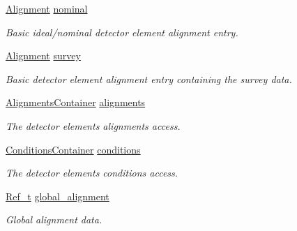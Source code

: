  \begin{DoxyCompactItemize}
\item 
\hyperlink{class_d_d4hep_1_1_alignments_1_1_alignment}{Alignment} \hyperlink{class_d_d4hep_1_1_geometry_1_1_det_element_object_a3020acb0795114c57c8d5bb536f310f4}{nominal}
\begin{DoxyCompactList}\small\item\em Basic ideal/nominal detector element alignment entry. \item\end{DoxyCompactList}\item 
\hyperlink{class_d_d4hep_1_1_alignments_1_1_alignment}{Alignment} \hyperlink{class_d_d4hep_1_1_geometry_1_1_det_element_object_ae01bd959a10eeb236ab0f21d7241a3a1}{survey}
\begin{DoxyCompactList}\small\item\em Basic detector element alignment entry containing the survey data. \item\end{DoxyCompactList}\item 
\hyperlink{class_d_d4hep_1_1_alignments_1_1_container}{AlignmentsContainer} \hyperlink{class_d_d4hep_1_1_geometry_1_1_det_element_object_a400be16718ec486e44ad340f86946fcd}{alignments}
\begin{DoxyCompactList}\small\item\em The detector elements alignments access. \item\end{DoxyCompactList}\item 
\hyperlink{class_d_d4hep_1_1_conditions_1_1_container}{ConditionsContainer} \hyperlink{class_d_d4hep_1_1_geometry_1_1_det_element_object_a80cf81ef1cd6f9f3d29865dee64ceaca}{conditions}
\begin{DoxyCompactList}\small\item\em The detector elements conditions access. \item\end{DoxyCompactList}\item 
\hyperlink{group___d_d4_h_e_p___g_e_o_m_e_t_r_y_ga40af83be6718bb8828a3d83dc7f8c930}{Ref\_\-t} \hyperlink{class_d_d4hep_1_1_geometry_1_1_det_element_object_a5f3e0ea44d06a48a4ba4525754f6ef03}{global\_\-alignment}
\begin{DoxyCompactList}\small\item\em Global alignment data. \item\end{DoxyCompactList}\item 

\end{DoxyCompactItemize}
